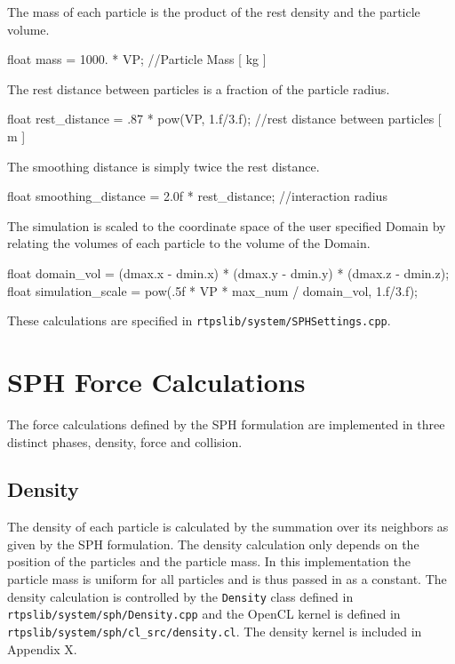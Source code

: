 The mass of each particle is the product of the rest density and the particle volume.
\begin{cppcode}{0}
float mass = 1000. * VP;                         //Particle Mass [ kg ]
\end{cppcode}

The rest distance between particles is a fraction of the particle radius.
\begin{cppcode}{0}
float rest_distance = .87 * pow(VP, 1.f/3.f);   //rest distance between particles [ m ]
\end{cppcode}

The smoothing distance is simply twice the rest distance.
\begin{cppcode}{0}
float smoothing_distance = 2.0f * rest_distance; //interaction radius
\end{cppcode}

The simulation is scaled to the coordinate space of the user specified Domain
by relating the volumes of each particle to the volume of the Domain.
\begin{cppcode}{0}
float domain_vol = (dmax.x - dmin.x) * (dmax.y - dmin.y) * (dmax.z - dmin.z);
float simulation_scale = pow(.5f * VP * max_num / domain_vol, 1.f/3.f);
\end{cppcode}

These calculations are specified in \verb|rtpslib/system/SPHSettings.cpp|.


\section{SPH Force Calculations}
The force calculations defined by the SPH formulation are implemented in three
distinct phases, density, force and collision.

\subsection{Density}
The density of each particle is calculated by the summation over its neighbors
as given by the SPH formulation. The density calculation only depends on the
position of the particles and the particle mass. In this implementation the
particle mass is uniform for all particles and is thus passed in as a constant.
The density calculation is controlled by the \verb|Density| class defined in
\verb|rtpslib/system/sph/Density.cpp| and the OpenCL kernel is defined in
\verb|rtpslib/system/sph/cl_src/density.cl|. The density kernel is included in
Appendix X.

